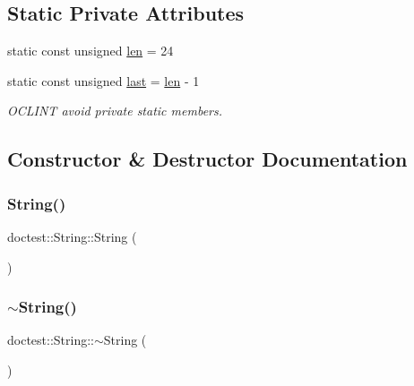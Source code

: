 \subsection*{Static Private Attributes}
\begin{DoxyCompactItemize}
\item 
static const unsigned \hyperlink{classdoctest_1_1String_a1025b38e7785f5541af920a237b744db}{len} = 24
\item 
static const unsigned \hyperlink{classdoctest_1_1String_a7e34a25b9fed27da2b69f75449ca510c}{last} = \hyperlink{classdoctest_1_1String_a1025b38e7785f5541af920a237b744db}{len} -\/ 1
\begin{DoxyCompactList}\small\item\em O\+C\+L\+I\+NT avoid private static members. \end{DoxyCompactList}\end{DoxyCompactItemize}


\subsection{Constructor \& Destructor Documentation}
\mbox{\label{classdoctest_1_1String_ab18d26f6c9e728c2fac77a501b8ca5f5}} 
\subsubsection{\texorpdfstring{String()}{String()}\hspace{0.1cm}{\footnotesize\ttfamily [1/5]}}
{\footnotesize\ttfamily doctest\+::\+String\+::\+String (\begin{DoxyParamCaption}{ }\end{DoxyParamCaption})}

\mbox{\label{classdoctest_1_1String_af5dce5deeb8f25a4866efdff75e92975}} 
\subsubsection{\texorpdfstring{$\sim$\+String()}{~String()}}
{\footnotesize\ttfamily doctest\+::\+String\+::$\sim$\+String (\begin{DoxyParamCaption}{ }\end{DoxyParamCaption})}

